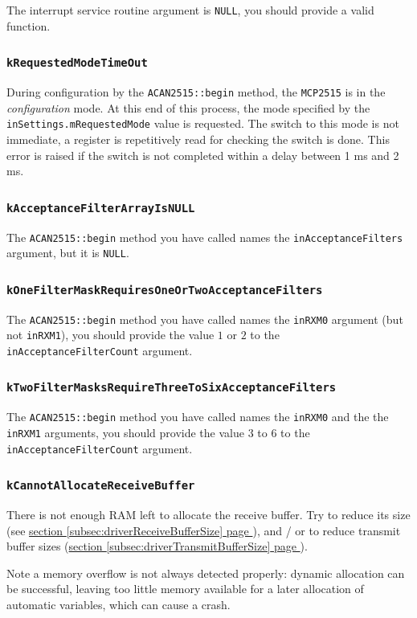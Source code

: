 \documentclass[9pt, a4paper, obeyspaces]{extarticle}
\newcommand\refSubsectionPage[1]{\hyperref[subsec:#1]{section \ref*{subsec:#1} page \pageref{subsec:#1}}}
\newcommand \subsubsectionLabel[2]{\subsubsection{#1}\label{subsubsec:#2}}
\begin{document}
The interrupt service routine argument is \texttt{NULL}, you should provide a valid function.


\subsubsectionLabel{\texttt{kRequestedModeTimeOut}}{kRequestedModeTimeOut}

During configuration by the \texttt{ACAN2515::begin} method, the  \texttt{MCP2515} is in the \emph{configuration} mode. At this end of this process, the mode specified by the \texttt{inSettings.mRequestedMode} value is requested. The switch to this mode is not immediate, a register is repetitively read for checking the switch is done. This error is raised if the switch is not completed within a delay between 1 ms and 2 ms.






\subsubsectionLabel{\texttt{kAcceptanceFilterArrayIsNULL}}{kAcceptanceFilterArrayIsNULL}

The \texttt{ACAN2515::begin} method you have called names the \texttt{inAcceptanceFilters} argument, but it is \texttt{NULL}.






\subsubsectionLabel{\texttt{kOneFilterMaskRequiresOneOrTwoAcceptanceFilters}}{kOneFilterMaskRequiresOneOrTwoAcceptanceFilters}

The \texttt{ACAN2515::begin} method you have called names the \texttt{inRXM0} argument (but not \texttt{inRXM1}), you should provide the value $1$ or $2$ to the \texttt{inAcceptanceFilterCount} argument.







\subsubsectionLabel{\texttt{kTwoFilterMasksRequireThreeToSixAcceptanceFilters}}{kTwoFilterMasksRequireThreeToSixAcceptanceFilters}

The \texttt{ACAN2515::begin} method you have called names the \texttt{inRXM0} and the the \texttt{inRXM1} arguments, you should provide the value $3$ to $6$ to the \texttt{inAcceptanceFilterCount} argument.



\subsubsectionLabel{\texttt{kCannotAllocateReceiveBuffer}}{kCannotAllocateReceiveBuffer}

There is not enough RAM left to allocate the receive buffer. Try to reduce its size (see \refSubsectionPage{driverReceiveBufferSize}), and / or to reduce transmit buffer sizes (\refSubsectionPage{driverTransmitBufferSize}).

Note a memory overflow is not always detected properly: dynamic allocation can be successful, leaving too little memory available for a later allocation of automatic variables, which can cause a crash.
\end{document}
